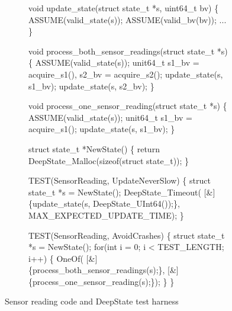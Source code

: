 \begin{figure}[t]
  \begin{subfigure}{0.5\columnwidth}
  {\scriptsize
  \begin{code}

void update\_state(struct state\_t *s, uint64\_t bv) \{
  ASSUME(valid\_state(s));
  ASSUME(valid\_bv(bv));
  ...
\}

void process\_both\_sensor\_readings(struct state\_t *s) \{
  ASSUME(valid\_state(s)); 
  unit64\_t s1\_bv = acquire\_s1(), s2\_bv = acquire\_s2();   
  update\_state(s, s1\_bv);  update\_state(s, s2\_bv);  
\}
  
void process\_one\_sensor\_reading(struct state\_t *s) \{
  ASSUME(valid\_state(s)); 
  unit64\_t s1\_bv = acquire\_s1(); 
  update\_state(s, s1\_bv); 
\}
\end{code}
}
\end{subfigure}
\begin{subfigure}{0.5\columnwidth}
{\scriptsize
\begin{code}
struct state\_t *NewState() \{
  return DeepState\_Malloc(sizeof(struct state\_t));   
\}
    
TEST(SensorReading, UpdateNeverSlow) \{
  struct state\_t *s = NewState();
  DeepState\_Timeout(
    [\&]\{update\_state(s, DeepState\_UInt64());\},
    MAX\_EXPECTED\_UPDATE\_TIME);
\}

TEST(SensorReading, AvoidCrashes) \{
  struct state\_t *s = NewState();
  for(int i = 0; i < TEST\_LENGTH; i++) \{
    OneOf(
        [\&]\{process\_both\_sensor\_readings(s);\},
        [\&]\{process\_one\_sensor\_reading(s);\});
  \}
\} 
\end{code}
}
\end{subfigure}
  \caption{Sensor reading code and DeepState test harness}
  \label{fig:assumption}
  \end{figure}

